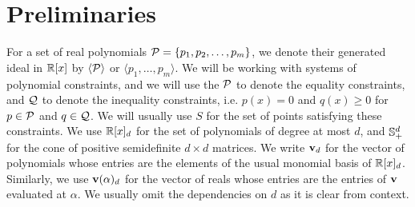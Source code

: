 \section{Preliminaries}
\label{sec:prelims}
For a set of real polynomials $\mathcal P = \{p_1, p_2, \dots, p_m\}$, we denote their generated ideal in $\mathbb R[x]$ by $\langle \mathcal P\rangle$ or $\langle p_1, \dots, p_m\rangle$. We will be working with systems of polynomial constraints, and we will use the $\mathcal P$ to denote the equality constraints, and $\mathcal Q$ to denote the inequality constraints, i.e. $p(x) = 0$ and $q(x) \geq 0$ for $p \in \mathcal P$ and $q \in \mathcal Q$. We will usually use $S$ for the set of points satisfying these constraints. We use $\mathbb R[x]_d$ for the set of polynomials of degree at most $d$, and $\mathbb{S}_+^{d}$ for the cone of positive semidefinite $d \times d$ matrices. We write ${\bf v}_d$ for the vector of polynomials whose entries are the elements of the usual monomial basis of $\mathbb R[x]_d$. Similarly, we use ${\bf v}(\alpha)_d$ for the vector of reals whose entries are the entries of ${\bf v}$ evaluated at $\alpha$. We usually omit the dependencies on $d$ as it is clear from context.

